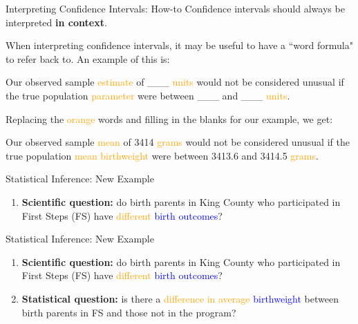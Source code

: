 \documentclass[10pt,t]{beamer}
\begin{document}
\begin{frame}{Interpreting Confidence Intervals: How-to}
Confidence intervals should always be interpreted \textbf{in context}.

\vspace{0.3cm}

When interpreting confidence intervals, it may be useful to have a ``word formula" to refer back to. An example of this is:

\vspace{0.3cm}

Our observed sample \textcolor{orange}{estimate} of \_\_\_ \textcolor{orange}{units} would not be considered unusual if the true population \textcolor{orange}{parameter} were between \_\_\_ and \_\_\_ \textcolor{orange}{units}.

\vspace{0.3cm}

Replacing the \textcolor{orange}{orange} words and filling in the blanks for our example, we get:

\vspace{0.3cm}

Our observed sample \textcolor{orange}{mean} of 3414 \textcolor{orange}{grams} would not be considered unusual if the true population \textcolor{orange}{mean birthweight} were between 3413.6 and 3414.5 \textcolor{orange}{grams}.

\end{frame}

\begin{frame}{Statistical Inference: New Example}

\begin{enumerate}
	\item \textbf{Scientific question:} do birth parents in King County who participated in First Steps (FS) have \textcolor{orange}{different} \textcolor{blue}{birth outcomes}?
\end{enumerate}

\end{frame}

\begin{frame}{Statistical Inference: New Example}

\begin{enumerate}
	\item \textbf{Scientific question:} do birth parents in King County who participated in First Steps (FS) have \textcolor{orange}{different} \textcolor{blue}{birth outcomes}?
	\item \textbf{Statistical question:} is there a \textcolor{orange}{difference in average} \textcolor{blue}{birthweight} between birth parents in FS and those not in the program?
\end{enumerate}

\end{frame}
\end{document}
